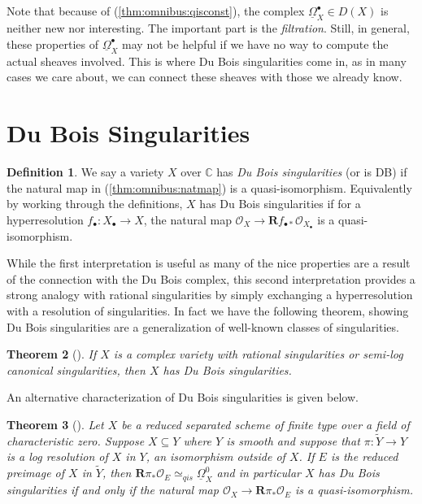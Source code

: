 \documentclass[proquest]{uwthesis}[2014/11/13]
\newtheorem{theorem}{Theorem}[section]
\theoremstyle{definition}
\newtheorem{definition}[theorem]{Definition}
\newcommand{\CC}{\mathbb{C}}
\newcommand{\OO}{\mathcal{O}}
\newcommand{\qis}{\simeq_{qis}}
\newcommand{\bR}{\textbf{R}}
\newcommand{\DB}{\underline{\Omega}}
\begin{document}
Note that because of (\ref{thm:omnibus:qisconst}), the complex $\DB_X^\bullet \in D(X)$ is neither new nor interesting.
The important part is the {\it filtration}.
Still, in general, these properties of $\DB_X^\bullet$ may not be helpful if we have no way to compute the actual sheaves involved.
This is where Du Bois singularities come in, as in many cases we care about, we can connect these sheaves with those we already know.

\section{Du Bois Singularities}

\begin{definition}
	\label{def:dubois}
	We say a variety $X$ over $\CC$ has {\it Du Bois singularities} (or is DB) if the natural map in (\ref{thm:omnibus:natmap}) is a quasi-isomorphism.
	Equivalently by working through the definitions, $X$  has Du Bois singularities if for a hyperresolution $f_{\bullet} : X_\bullet \rightarrow X$, the natural map ${\OO_X \rightarrow\bR f_{\bullet *} \OO_{X_\bullet}}$ is a quasi-isomorphism.
\end{definition}

While the first interpretation is useful as many of the nice properties are a result of the connection with the Du Bois complex, this second interpretation provides a strong analogy with rational singularities by simply exchanging a hyperresolution with a resolution of singularities.
In fact we have the following theorem, showing Du Bois singularities are a generalization of well-known classes of singularities.
\begin{theorem}[{\cite[6.25 and 6.32]{Kollar2013}}]
	If $X$ is a complex variety with rational singularities or semi-log canonical singularities, then $X$ has Du Bois singularities.
\end{theorem}

An alternative characterization of Du Bois singularities is given below.

\begin{theorem}[\cite{Schwede2007}]
	Let $X$ be a reduced separated scheme of finite type over a field of characteristic zero.
	Suppose $X \subseteq Y$ where $Y$ is smooth and suppose that $\pi : \tilde{Y} \rightarrow Y$ is a log resolution of $X$ in $Y$, an isomorphism outside of $X$.
	If $E$ is the reduced preimage of $X$ in $\tilde{Y}$, then $\bR \pi_* \OO_E \qis \DB_X^0$ and in particular $X$ has Du Bois singularities if and only if the natural map $\OO_X \rightarrow \bR \pi_* \OO_E$ is a quasi-isomorphism.
\end{theorem}
\end{document}
